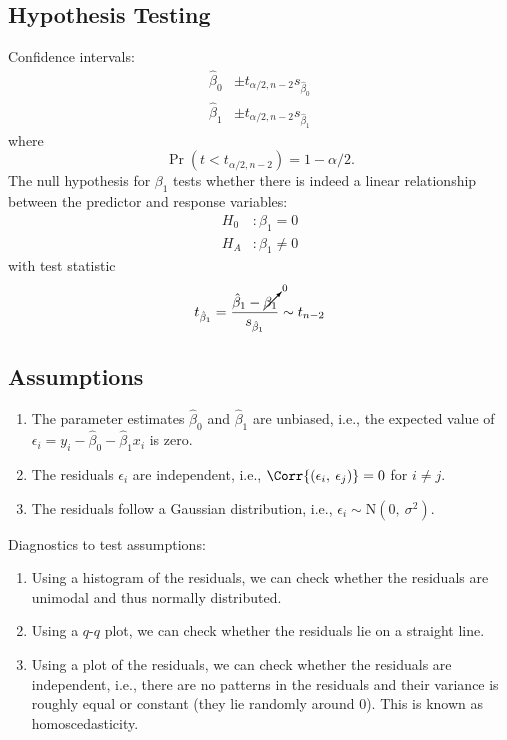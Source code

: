 \documentclass{article}
\begin{document}
\begin{multicols}{3}
    \subsection{Hypothesis Testing}
    Confidence intervals:
    \begin{align*}
        \hat{\beta}_0 & \pm t_{\alpha / 2, n - 2} s_{\hat{\beta}_0} \\
        \hat{\beta}_1 & \pm t_{\alpha / 2, n - 2} s_{\hat{\beta}_1}
    \end{align*}
    where
    \begin{equation*}
        \Pr{\left( t < t_{\alpha / 2, n - 2} \right)} = 1 - \alpha / 2.
    \end{equation*}
    The null hypothesis for \(\beta_1\) tests whether there is indeed a linear relationship between the
    predictor and response variables:
    \begin{align*}
        H_0 & : \beta_1 = 0    \\
        H_A & : \beta_1 \neq 0
    \end{align*}
    with test statistic
    \begin{equation*}
        t_{\hat{\beta}_1} = \frac{\hat{\beta}_1 - \cancelto{0}{\beta_1}}{s_{\hat{\beta}_1}} \sim t_{n - 2}
    \end{equation*}
    \subsection{Assumptions}
    \begin{enumerate}
        \item The parameter estimates \(\hat{\beta}_0\) and \(\hat{\beta}_1\) are unbiased, i.e., the expected value of \(\epsilon_i = y_i - \hat{\beta}_0 - \hat{\beta}_1 x_i\) is zero.
        \item The residuals \(\epsilon_i\) are independent, i.e., \(\Corr{\left( \epsilon_i,\: \epsilon_j \right)} = 0\) for \(i \neq j\).
        \item The residuals follow a Gaussian distribution, i.e., \(\epsilon_i \sim \mathrm{N}\left( 0,\: \sigma^2 \right)\).
    \end{enumerate}
    Diagnostics to test assumptions:
    \begin{enumerate}
        \item Using a histogram of the residuals, we can check whether the residuals are unimodal and thus normally distributed.
        \item Using a \(q\)-\(q\) plot, we can check whether the residuals lie on a straight line.
        \item Using a plot of the residuals, we can check whether the residuals are independent, i.e.,
              there are no patterns in the residuals and their variance is roughly equal or constant (they lie randomly around 0).
              This is known as homoscedasticity.
    \end{enumerate}

\end{multicols}
\end{document}
